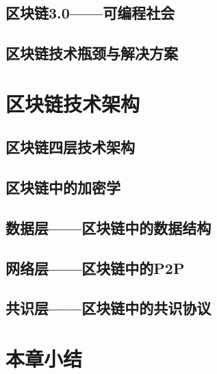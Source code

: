 \subsection{区块链3.0——可编程社会}

\subsection{区块链技术瓶颈与解决方案}

\section{区块链技术架构}\label{sec:bc-arch}

\subsection{区块链四层技术架构}

\subsection{区块链中的加密学}

\subsection{数据层——区块链中的数据结构}

\subsection{网络层——区块链中的P2P}

\subsection{共识层——区块链中的共识协议}




\section{本章小结}